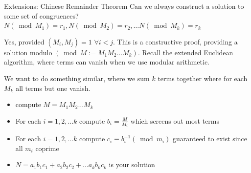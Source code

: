 \documentclass[aspectratio=169]{beamer}
\begin{document}
\begin{frame}{Extensions: Chinese Remainder Theorem}
    Can we always construct a solution to some set of congruences? $N (\bmod M_1) = r_1, N(\bmod M_2) = r_2,\dots N(\bmod M_k) = r_k$

    \pause
    
    Yes, provided $(M_i, M_j) = 1$ $\forall i<j$. This is a constructive proof, providing a solution modulo $(\bmod M := M_1M_2\dots M_k)$. Recall the extended Euclidean algorithm, where terms can vanish when we use modular arithmetic. 
    
    We want to do something similar, where we sum $k$ terms together where for each $M_k$ all terms but one vanish. 

    \begin{itemize}
        \item compute $M = M_1 M_2 \dots M_k$
        \item For each $i = 1, 2, \dots k$ compute $b_i = \frac{M}{M_i}$ which screens out most terms
        \item For each $i = 1, 2, \dots k$ compute $c_i \equiv b_i^{-1} (\bmod m_i)$ guaranteed to exist since all $m_i$ coprime
        \item $N = a_1b_1c_1 + a_2b_2c_2 + \dots a_k b_k c_k$  is your solution
    \end{itemize}
    
\end{frame}
\end{document}
